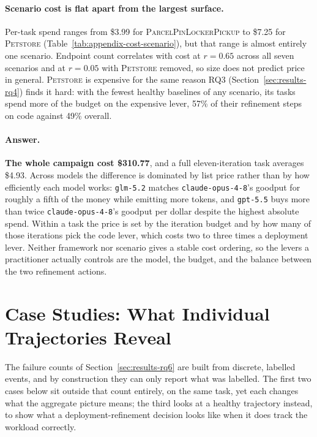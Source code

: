 \paragraph{Scenario cost is flat apart from the largest surface.}
Per-task spend ranges from \$3.99 for \textsc{ParcelPinLockerPickup} to
\$7.25 for \textsc{Petstore} (Table~\ref{tab:appendix-cost-scenario}), but
that range is almost entirely one scenario. Endpoint count correlates with
cost at $r=0.65$ across all seven scenarios and at $r=0.05$ with
\textsc{Petstore} removed, so size does not predict price in general.
\textsc{Petstore} is expensive for the same reason RQ3
(Section~\ref{sec:results-rq4}) finds it hard: with the fewest healthy
baselines of any scenario, its tasks spend more of the budget on the
expensive lever, 57\% of their refinement steps on code against 49\%
overall.

\paragraph{Answer.}
\textbf{The whole campaign cost \$310.77}, and a full eleven-iteration
task averages \$4.93. Across models the difference is dominated by list
price rather than by how efficiently each model works:
\texttt{glm-5.2} matches \texttt{claude-opus-4-8}'s goodput for roughly a
fifth of the money while emitting more tokens, and \texttt{gpt-5.5} buys
more than twice \texttt{claude-opus-4-8}'s goodput per dollar despite the
highest absolute spend. Within a task the price is set by the iteration
budget and by how many of those iterations pick the code lever, which
costs two to three times a deployment lever. Neither framework nor
scenario gives a stable cost ordering, so the levers a practitioner
actually controls are the model, the budget, and the balance between the
two refinement actions.


\section{Case Studies: What Individual Trajectories Reveal}
\label{sec:results-case-studies}

The failure counts of Section~\ref{sec:results-rq6} are built from
discrete, labelled events, and by construction they can only report what
was labelled. The first two cases below sit outside that count entirely,
on the same task, yet each changes what the aggregate picture means; the
third looks at a healthy trajectory instead, to show what a
deployment-refinement decision looks like when it does track the workload
correctly.

